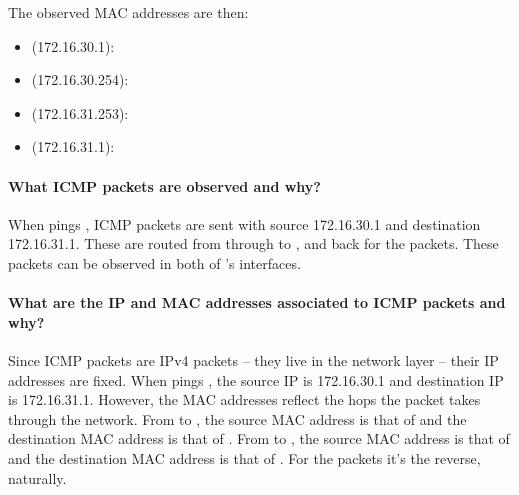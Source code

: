\documentclass[compilation.tex]{subfiles}
\begin{document}
The observed MAC addresses are then:
\begin{itemize}[noitemsep,leftmargin=*,topsep=0pt]
\item {} (172.16.30.1): 
\item {} (172.16.30.254): 
\item {} (172.16.31.253): 
\item {} (172.16.31.1): 
\end{itemize}

\paragraph{What ICMP packets are observed and why?}
When  pings , ICMP  packets are sent with source 172.16.30.1 and destination 172.16.31.1. These are routed from  through  to , and back for the  packets. These packets can be observed in both of 's interfaces.

\paragraph{What are the IP and MAC addresses associated to ICMP packets and why?}
Since ICMP packets are IPv4 packets -- they live in the network layer -- their IP addresses are fixed.
When  pings , the source IP is 172.16.30.1 and destination IP is 172.16.31.1.
However, the MAC addresses reflect the hops the packet takes through the network.
From  to , the source MAC address is that of  and the destination MAC address is that of .
From  to , the source MAC address is that of  and the destination MAC address is that of .
For the  packets it's the reverse, naturally.
\end{document}

